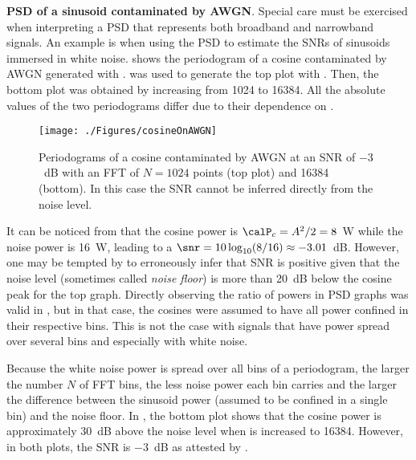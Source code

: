 \bExample \textbf{PSD of a sinusoid contaminated by AWGN}. Special care must be exercised when interpreting a PSD that represents both broadband and narrowband signals. An example is when using the PSD to estimate the SNRs of sinusoids immersed in white noise.
 shows the periodogram of a cosine contaminated by AWGN generated with .
 was used to generate the top plot with . Then, the bottom plot was obtained by increasing  from 1024 to 16384. All the absolute values of the two periodograms differ due to their dependence on .

\begin{figure}[htbp]
\centering
\texttt{[image: ./Figures/cosineOnAWGN]}
\caption{Periodograms of a cosine contaminated by AWGN at an SNR of $-3$~dB with an FFT of $N=1024$ points (top plot) and 16384 (bottom). In this case the SNR cannot be inferred directly from the noise level.\label{fig:cosineOnAWGN}}
\end{figure}

It can be noticed from  that the cosine power is $\calP_c = A^2/2 = 8$~W while the noise power is 16~W, leading to a $\snr=10 \log_{10}(8/16)\approx -3.01$~dB. However, one may be tempted by  to erroneously infer that SNR is positive given that the noise level (sometimes called \emph{noise floor}) is more than 20~dB below the cosine peak for the top graph. Directly observing the ratio of powers in PSD graphs was valid in , but in that case,  the cosines were assumed to have all power confined in their respective bins. This is not the case with signals that have power spread over several bins and especially with white noise.

Because the white noise power is spread over all bins of a periodogram, the larger the number $N$ of FFT bins, the less noise power each bin carries and the larger the difference between the sinusoid power (assumed to be confined in a single bin) and the noise floor. In , the bottom plot shows that the cosine power is approximately 30~dB above the noise level when  is increased to 16384. However, in both plots, the SNR is $-3$~dB as attested by . 

